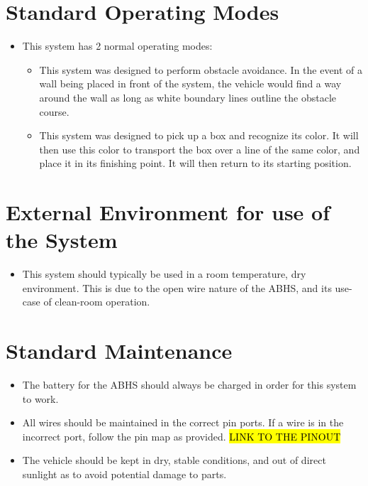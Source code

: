 \documentclass[11pt]{report}
\begin{document}
\section{Standard Operating Modes}
\begin{itemize}
\item This system has 2 normal operating modes:
    \begin{itemize}
        \item This system was designed to perform obstacle avoidance. In the event of a wall being placed in front of the system, the vehicle would find a way around the wall as long as white boundary lines outline the obstacle course.
        \item This system was designed to pick up a box and recognize its color. It will then use this color to transport the box over a line of the same color, and place it in its finishing point. It will then return to its starting position. 
\end{itemize}
\end{itemize}
\section {External Environment for use of the System}
\begin{itemize}
    \item This system should typically be used in a room temperature, dry environment. This is due to the open wire nature of the \gls{ABHS}, and its use-case of clean-room operation.
\end{itemize}
\section{Standard Maintenance}
\begin{itemize}
    \item The battery for the \gls{ABHS} should always be charged in order for this system to work.
    \item All wires should be maintained in the correct pin ports. If a wire is in the incorrect port, follow the pin map as provided. \hl{LINK TO THE PINOUT}
    \item The vehicle should be kept in dry, stable conditions, and out of direct sunlight as to avoid potential damage to parts.
\end{itemize}
\end{document}
